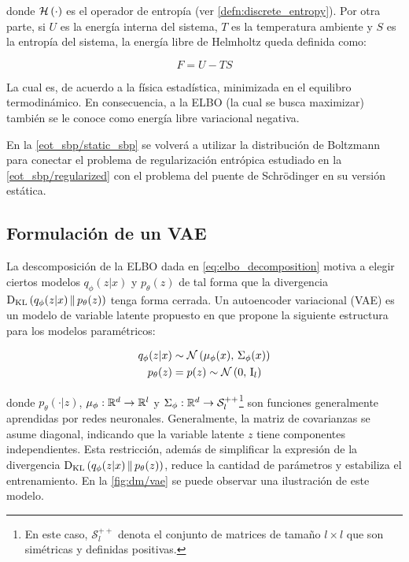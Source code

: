 donde $\mathcal{H}\left(\cdot\right)$ es el operador de entropía (ver \autoref{defn:discrete_entropy}). Por otra parte, si $U$ es la energía interna del sistema, $T$ es la temperatura ambiente y $S$ es la entropía del sistema, la energía libre de Helmholtz queda definida como:

\begin{equation*}
	F = U-TS
\end{equation*}

La cual es, de acuerdo a la física estadística, minimizada en el equilibro termodinámico. En consecuencia, a la ELBO (la cual se busca maximizar) también se le conoce como energía libre variacional negativa.

En la \autoref{eot_sbp/static_sbp} se volverá a utilizar la distribución de Boltzmann para conectar el problema de regularización entrópica estudiado en la \autoref{eot_sbp/regularized} con el problema del puente de Schrödinger en su versión estática.

\subsection{Formulación de un VAE}
\label{dm/vae/formulation}

La descomposición de la ELBO dada en \eqref{eq:elbo_decomposition} motiva a elegir ciertos modelos $q_\phi(z|x)$ y $p_\theta(z)$ de tal forma que la divergencia $\operatorname{D_{KL}}\left(q_\phi(z|x)\,\|\,p_\theta(z)\right)$ tenga forma cerrada. Un autoencoder variacional (VAE) es un modelo de variable latente propuesto en \cite{kingma2022autoencoding} que propone la siguiente estructura para los modelos paramétricos:

\begin{align}
    q_\phi(z|x) & \sim \mathcal{N}\left(\mu_\phi(x),\,\Sigma_\phi(x)\right) \label{eq:vae_model_posterior} \\
    p_\theta(z) & = p(z) \sim \mathcal{N}\left(0,\,\operatorname{I}_{l}\right) \label{eq:vae_model_prior}
\end{align}

donde $p_\theta(\cdot|z)$, $\mu_\phi:\mathbb{R}^d\to\mathbb{R}^l$ y $\Sigma_\phi:\mathbb{R}^d\to\mathcal{S}_l^{++}$\footnote{En este caso, $\mathcal{S}_l^{++}$ denota el conjunto de matrices de tamaño $l\times l$ que son simétricas y definidas positivas.} son funciones generalmente aprendidas por redes neuronales. Generalmente, la matriz de covarianzas se asume diagonal, indicando que la variable latente $z$ tiene componentes independientes. Esta restricción, además de simplificar la expresión de la divergencia $\operatorname{D_{KL}}\left(q_\phi(z|x)\,\|\,p_\theta(z)\right)$, reduce la cantidad de parámetros y estabiliza el entrenamiento. En la \autoref{fig:dm/vae} se puede observar una ilustración de este modelo.

